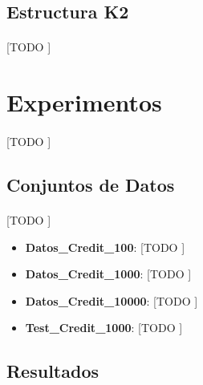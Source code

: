 \documentclass{article}
\begin{document}
		\subsection{Estructura K2}
		\label{sec:structure_K2}

			\paragraph{}
			[TODO ]



	\section{Experimentos}
	\label{sec:experiments}

		\paragraph{}
		[TODO ]

		\subsection{Conjuntos de Datos}

			\paragraph{}
			[TODO ]

			\begin{itemize}
				\item \textbf{Datos\_Credit\_100}: [TODO ]
				\item \textbf{Datos\_Credit\_1000}: [TODO ]
				\item \textbf{Datos\_Credit\_10000}: [TODO ]
				\item \textbf{Test\_Credit\_1000}: [TODO ]
			\end{itemize}


		\subsection{Resultados}
\end{document}
